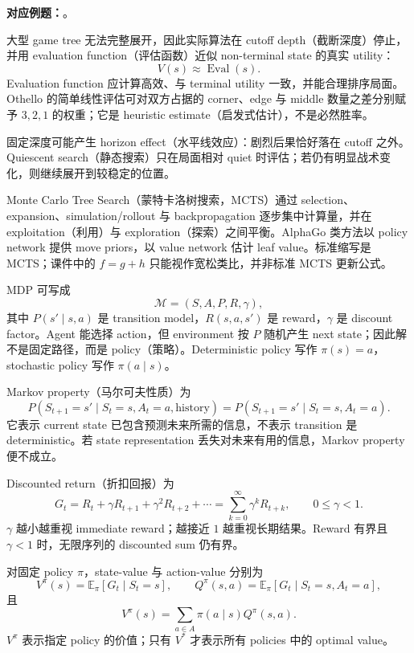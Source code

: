 \textbf{对应例题：}。


大型 game tree 无法完整展开，因此实际算法在 cutoff depth（截断深度）停止，并用 evaluation function（评估函数）近似 non-terminal state 的真实 utility：
\[
  V(s)\approx \operatorname{Eval}(s).
\]
Evaluation function 应计算高效、与 terminal utility 一致，并能合理排序局面。Othello 的简单线性评估可对双方占据的 corner、edge 与 middle 数量之差分别赋予 $3,2,1$ 的权重；它是 heuristic estimate（启发式估计），不是必然胜率。

固定深度可能产生 horizon effect（水平线效应）：剧烈后果恰好落在 cutoff 之外。Quiescent search（静态搜索）只在局面相对 quiet 时评估；若仍有明显战术变化，则继续展开到较稳定的位置。

Monte Carlo Tree Search（蒙特卡洛树搜索，MCTS）通过 selection、expansion、simulation/rollout 与 backpropagation 逐步集中计算量，并在 exploitation（利用）与 exploration（探索）之间平衡。AlphaGo 类方法以 policy network 提供 move priors，以 value network 估计 leaf value。标准缩写是 MCTS；课件中的 $f=g+h$ 只能视作宽松类比，并非标准 MCTS 更新公式。


MDP 可写成
\[
  \boxed{\mathcal M=(S,A,P,R,\gamma)},
\]
其中 $P(s'\mid s,a)$ 是 transition model，$R(s,a,s')$ 是 reward，$\gamma$ 是 discount factor。Agent 能选择 action，但 environment 按 $P$ 随机产生 next state；因此解不是固定路径，而是 policy（策略）。Deterministic policy 写作 $\pi(s)=a$，stochastic policy 写作 $\pi(a\mid s)$。

Markov property（马尔可夫性质）为
\[
  P(S_{t+1}=s'\mid S_t=s,A_t=a,\text{history})
  =P(S_{t+1}=s'\mid S_t=s,A_t=a).
\]
它表示 current state 已包含预测未来所需的信息，不表示 transition 是 deterministic。若 state representation 丢失对未来有用的信息，Markov property 便不成立。


Discounted return（折扣回报）为
\[
  G_t=R_t+\gamma R_{t+1}+\gamma^2R_{t+2}+\cdots
      =\sum_{k=0}^{\infty}\gamma^kR_{t+k},
  \qquad 0\le\gamma<1.
\]
$\gamma$ 越小越重视 immediate reward；越接近 $1$ 越重视长期结果。Reward 有界且 $\gamma<1$ 时，无限序列的 discounted sum 仍有界。

对固定 policy $\pi$，state-value 与 action-value 分别为
\[
  V^\pi(s)=\mathbb E_\pi[G_t\mid S_t=s],
  \qquad
  Q^\pi(s,a)=\mathbb E_\pi[G_t\mid S_t=s,A_t=a],
\]
且
\[
  V^\pi(s)=\sum_{a\in A}\pi(a\mid s)Q^\pi(s,a).
\]
$V^\pi$ 表示指定 policy 的价值；只有 $V^*$ 才表示所有 policies 中的 optimal value。

